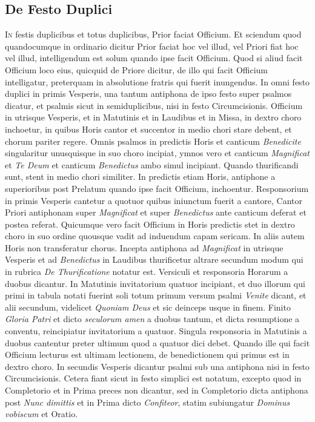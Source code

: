 \documentclass[11pt,openany]{book}
\newcommand*\zallmancaps{\usefont{U}{Zallman}{xl}{n}}
\newcommand{\ubsubsection}[2]{%
	\subsection*{#1}%
	\phantomsection%
	\addcontentsline{toc}{subsection}{#1}%
	\hypertarget{#2}{}%
}
\begin{document}
\begin{multicols*}{2}
{\color{Red} \ubsubsection{De Festo Duplici}{ordinarium-de-festo-duplici}}
\lettrine[lines=2]{\zallmancaps \color{Red} I}{n} festis duplicibus et totus duplicibus, Prior faciat Officium. Et sciendum quod quandocumque in ordinario dicitur Prior faciat hoc vel illud, vel Priori fiat hoc vel illud, intelligendum est solum quando ipse facit Officium. Quod si aliud facit Officium loco eius, quicquid de Priore dicitur, de illo qui facit Officium intelligatur, preterquam in absolutione fratris qui fuerit inungendus.
In omni festo duplici in primis Vesperis, una tantum antiphona de ipso festo super psalmos dicatur, et psalmis sicut in semiduplicibus, nisi in festo Circumcisionis. Officium in utrisque Vesperis, et in Matutinis et in Laudibus et in Missa, in dextro choro inchoetur, in quibus Horis cantor et succentor in medio chori stare debent, et chorum pariter regere. Omnis psalmos in predictis Horis et canticum \textit{Benedicite} singularitur unusquisque in suo choro incipiat, ymnos vero et canticum \textit{Magnificat} et \textit{Te Deum} et canticum \textit{Benedictus} ambo simul incipiant. Quando thurificandi sunt, stent in medio chori similiter. In predictis etiam Horis, antiphone a superioribus post Prelatum quando ipse facit Officium, inchoentur. Responsorium in primis Vesperis cantetur a quotuor quibus iniunctum fuerit a cantore, Cantor Priori antiphonam super \textit{Magnificat} et super \textit{Benedictus} ante canticum deferat et postea referat. Quicumque vero facit Officium in Horis predictis stet in dextro choro in suo ordine quousque vadit ad induendum capam sericam. In aliis autem Horis non transferatur chorus. Incepta antiphona ad \textit{Magnificat} in utrisque Vesperis et ad \textit{Benedictus} in Laudibus thurificetur altrare secundum modum qui in rubrica \textit{De Thurificatione} notatur est.
Versiculi et responsoria Horarum a duobus dicantur. In Matutinis invitatorium quatuor incipiant, et duo illorum qui primi in tabula notati fuerint soli totum primum versum psalmi \textit{Venite} dicant, et alii secundum, videlicet \textit{Quoniam Deus} et sic deinceps usque in finem.
Finito \textit{Gloria Patri} et dicto \textit{seculorum amen} a duobus tantum, et dicta resumptione a conventu, reincipiatur invitatorium a quatuor.
Singula responsoria in Matutinis a duobus cantentur preter ultimum quod a quatuor dici debet. Quando ille qui facit Officium lecturus est ultimam lectionem, de benedictionem qui primus est in dextro choro. In secundis Vesperis dicantur psalmi sub una antiphona nisi in festo Circumcisionis.
Cetera fiant sicut in festo simplici est notatum, excepto quod in Completorio et in Prima preces non dicantur, sed in Completorio dicta antiphona post \textit{Nunc dimittis} et in Prima dicto \textit{Confiteor}, statim subiungatur \textit{Dominus vobiscum} et Oratio.


\end{multicols*}
\end{document}
